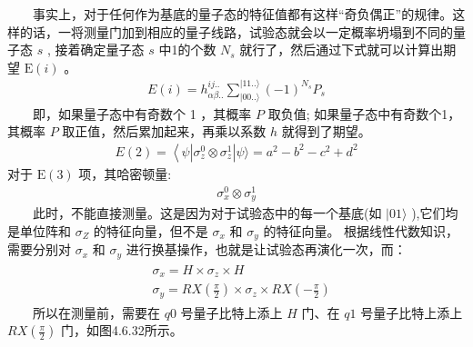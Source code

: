 \documentclass[a4paper,11pt,english]{sphinxmanual}
\begin{document}
\sphinxAtStartPar
  事实上，对于任何作为基底的量子态的特征值都有这样“奇负偶正”的规律。这样的话，一将测量门加到相应的量子线路，试验态就会以一定概率坍塌到不同的量子态  \(s\) , 接着确定量子态  \(s\) 中1的个数  \(N_s\) 就行了，然后通过下式就可以计算出期望 \(\mathrm{E}(i)\) 。
\begin{equation*}
\begin{split}E(i)=h_{\alpha \beta ..}^{i j ..} \sum_{\mid 00 . .\rangle}^{\mid 11 ..\rangle}(-1)^{N_{s}} P_{s}\end{split}
\end{equation*}
\sphinxAtStartPar
  即，如果量子态中有奇数个 1 ，其概率  \(P\) 取负值; 如果量子态中有奇数个1，其概率  \(P\) 取正值，然后累加起来，再乘以系数  \(h\) 就得到了期望。
\begin{equation*}
\begin{split}E(2)=\left\langle\psi\left|\sigma_{z}^{0} \otimes \sigma_{z}^{1}\right| \psi\rangle=a^{2}-b^{2}-c^{2}+d^{2}\right.\end{split}
\end{equation*}
\sphinxAtStartPar
对于 \(\mathrm{E}(3)\) 项，其哈密顿量:
\begin{equation*}
\begin{split}\sigma_{x}^{0} \otimes \sigma_{y}^{1}\end{split}
\end{equation*}
\sphinxAtStartPar
  此时，不能直接测量。这是因为对于试验态中的每一个基底(如  \(|01\rangle\) ),它们均是单位阵和  \(\sigma_{Z}\) 的特征向量，但不是  \(\sigma_{x}\) 和  \(\sigma_{y}\) 的特征向量。 根据线性代数知识，需要分别对  \(\sigma_{x}\) 和  \(\sigma_{y}\) 进行换基操作，也就是让试验态再演化一次，而：
\begin{equation*}
\begin{split}\begin{aligned} &\sigma_{x}=H \times \sigma_{z} \times H \\ &\sigma_{y}=R X\left(\frac{\pi}{2}\right) \times \sigma_{z} \times R X\left(-\frac{\pi}{2}\right) \end{aligned}\end{split}
\end{equation*}
\sphinxAtStartPar
  所以在测量前，需要在 \(q 0\) 号量子比特上添上  \(H\) 门、在  \(q 1\) 号量子比特上添上  \(RX\left(\frac{\pi}{2}\right)\) 门，如图4.6.32所示。

\end{document}
